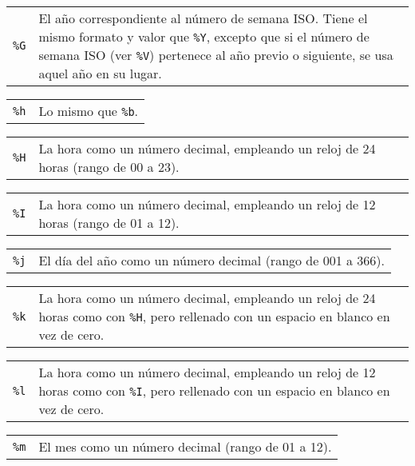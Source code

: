 \documentclass[11pt,spanish]{report}
\begin{document}
\begin{tabular}{@{}p{20pt}p{421.5pt}@{}}
{\tt\%G}&El año correspondiente al número de semana ISO. Tiene el mismo formato y valor que \verb|%Y|, excepto que si el número de semana ISO (ver \verb|%V|) pertenece al año previo o siguiente, se usa aquel año en su lugar.\\
\end{tabular}

\begin{tabular}{@{}p{20pt}p{421.5pt}@{}}
{\tt\%h}&Lo mismo que \verb|%b|.\\
\end{tabular}

\begin{tabular}{@{}p{20pt}p{421.5pt}@{}}
{\tt\%H}&La hora como un número decimal, empleando un reloj de 24 horas (rango de 00 a 23).\\
\end{tabular}

\begin{tabular}{@{}p{20pt}p{421.5pt}@{}}
{\tt\%I}&La hora como un número decimal, empleando un reloj de 12 horas (rango de 01 a 12).\\
\end{tabular}

\begin{tabular}{@{}p{20pt}p{421.5pt}@{}}
{\tt\%j}&El día del año como un número decimal (rango de 001 a 366).\\
\end{tabular}

\begin{tabular}{@{}p{20pt}p{421.5pt}@{}}
{\tt\%k}&La hora como un número decimal, empleando un reloj de 24 horas como con \verb|%H|, pero rellenado con un espacio en blanco en vez de cero.\\
\end{tabular}

\begin{tabular}{@{}p{20pt}p{421.5pt}@{}}
{\tt\%l}&La hora como un número decimal, empleando un reloj de 12 horas como con \verb|%I|, pero rellenado con un espacio en blanco en vez de cero.\\
\end{tabular}

\begin{tabular}{@{}p{20pt}p{421.5pt}@{}}
{\tt\%m}&El mes como un número decimal (rango de 01 a 12).\\
\end{tabular}
\end{document}
